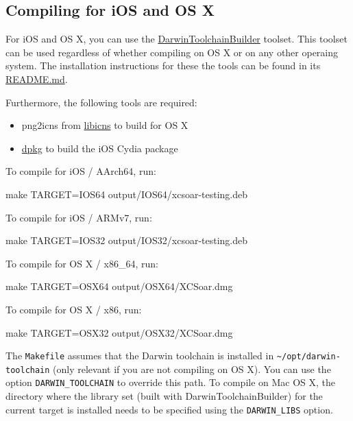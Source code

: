 \subsection{Compiling for iOS and OS X}

For iOS and OS X, you can use the
\href{https://github.com/felixhaedicke/DarwinToolchainBuilder}{DarwinToolchainBuilder}
toolset. This toolset can be used regardless of whether compiling on OS X or on
any other operaing system. The installation instructions for these the tools
can be found in its
\href{https://github.com/felixhaedicke/DarwinToolchainBuilder/blob/master/README.md}{README.md}.

Furthermore, the following tools are required:
\begin{itemize}
\item png2icns from \href{http://icns.sourceforge.net}{libicns} to build for
  OS X
\item \href{https://alioth.debian.org/projects/dpkg}{dpkg} to build the iOS
  Cydia package
\end{itemize}

To compile for iOS / AArch64, run:

\begin{verbatim*}
make TARGET=IOS64 output/IOS64/xcsoar-testing.deb
\end{verbatim*}

To compile for iOS / ARMv7, run:

\begin{verbatim*}
make TARGET=IOS32 output/IOS32/xcsoar-testing.deb
\end{verbatim*}

To compile for OS X / x86\_64, run:

\begin{verbatim*}
make TARGET=OSX64 output/OSX64/XCSoar.dmg
\end{verbatim*}

To compile for OS X / x86, run:

\begin{verbatim*}
make TARGET=OSX32 output/OSX32/XCSoar.dmg
\end{verbatim*}

The \texttt{Makefile} assumes that the Darwin toolchain is installed in
\verb|~/opt/darwin-toolchain| (only relevant if you are not compiling on OS X).
You can use the option \verb|DARWIN_TOOLCHAIN| to override this path.
To compile on Mac OS X, the directory where the library set (built with
DarwinToolchainBuilder) for the current target is installed needs to be
specified using the \verb|DARWIN_LIBS| option.

